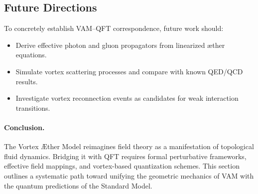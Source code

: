 \subsection{Future Directions}

To concretely establish VAM–QFT correspondence, future work should:
\begin{itemize}
    \item Derive effective photon and gluon propagators from linearized æther equations.
    \item Simulate vortex scattering processes and compare with known QED/QCD results.
    \item Investigate vortex reconnection events as candidates for weak interaction transitions.
\end{itemize}

\paragraph{Conclusion.} The Vortex \AE ther Model reimagines field theory as a manifestation of topological fluid dynamics. Bridging it with QFT requires formal perturbative frameworks, effective field mappings, and vortex-based quantization schemes. This section outlines a systematic path toward unifying the geometric mechanics of VAM with the quantum predictions of the Standard Model.
